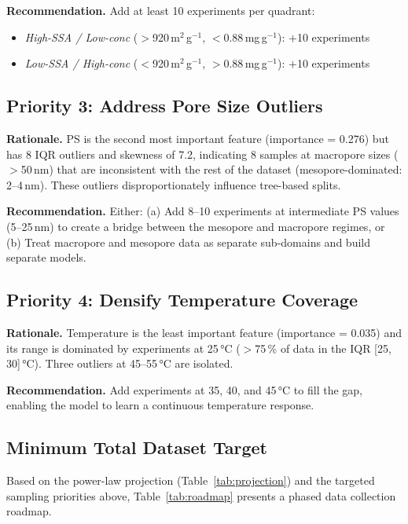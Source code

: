 \documentclass[12pt,a4paper]{article}
\begin{document}
\textbf{Recommendation.} Add at least 10 experiments per quadrant:
\begin{itemize}[leftmargin=*]
  \item \textit{High-SSA / Low-conc} ($>$920\,m$^2$\,g$^{-1}$,
        $<$0.88\,mg\,g$^{-1}$): $+$10 experiments
  \item \textit{Low-SSA / High-conc} ($<$920\,m$^2$\,g$^{-1}$,
        $>$0.88\,mg\,g$^{-1}$): $+$10 experiments
\end{itemize}

\subsection{Priority 3: Address Pore Size Outliers}

\textbf{Rationale.} PS is the second most important feature (importance =
0.276) but has 8 IQR outliers and skewness of 7.2, indicating 8 samples
at macropore sizes ($>$50\,nm) that are inconsistent with the rest of the
dataset (mesopore-dominated: 2--4\,nm).  These outliers disproportionately
influence tree-based splits.

\textbf{Recommendation.} Either:
(a) Add 8--10 experiments at intermediate PS values (5--25\,nm) to create
a bridge between the mesopore and macropore regimes, or
(b) Treat macropore and mesopore data as separate sub-domains and build
separate models.

\subsection{Priority 4: Densify Temperature Coverage}

\textbf{Rationale.} Temperature is the least important feature (importance
= 0.035) and its range is dominated by experiments at 25\,°C ($>$75\,\% of
data in the IQR [25, 30]\,°C).  Three outliers at 45--55\,°C are isolated.

\textbf{Recommendation.} Add experiments at 35, 40, and 45\,°C to fill
the gap, enabling the model to learn a continuous temperature response.

\subsection{Minimum Total Dataset Target}

Based on the power-law projection (Table~\ref{tab:projection}) and the
targeted sampling priorities above, Table~\ref{tab:roadmap} presents a
phased data collection roadmap.
\end{document}
